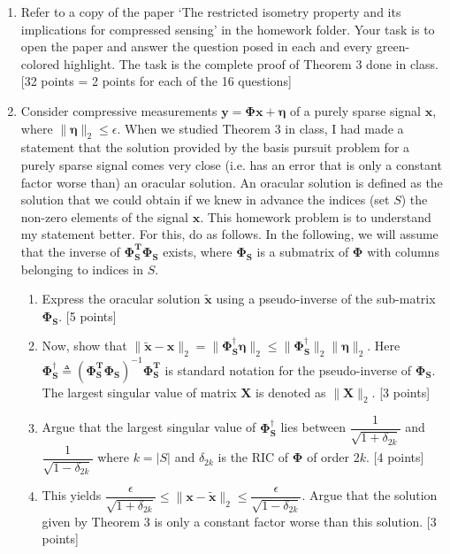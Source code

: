 \documentclass[11pt]{article}
\begin{document}
\begin{enumerate}
\item Refer to a copy of the paper `The restricted isometry property and its implications for compressed sensing' in the homework folder. Your task is to open the paper and answer the question posed in each and every green-colored highlight. The task is the complete proof of Theorem 3 done in class. \textsf{[32 points = 2 points for each of the 16 questions]}

\item Consider compressive measurements $\boldsymbol{y} = \boldsymbol{\Phi x} + \boldsymbol{\eta}$ of a purely sparse signal $\boldsymbol{x}$, where $\|\boldsymbol{\eta}\|_2 \leq \epsilon$. When we studied Theorem 3 in class, I had made a statement that the solution provided by the basis pursuit problem for a purely sparse signal comes very close (i.e. has an error that is only a constant factor worse than) an oracular solution. An oracular solution is defined as the solution that we could obtain if we knew in advance the indices (set $S$) the non-zero elements of the signal $\boldsymbol{x}$. This homework problem is to understand my statement better. For this, do as follows. In the following, we will assume that the inverse of $\boldsymbol{\Phi^T_S \Phi_S}$ exists, where $\boldsymbol{\Phi_S}$ is a submatrix of $\boldsymbol{\Phi}$ with columns belonging to indices in $S$.
\begin{enumerate}
\item Express the oracular solution $\boldsymbol{\tilde{x}}$ using a pseudo-inverse of the sub-matrix $\boldsymbol{\Phi_S}$. \textsf{[5 points]}
\item Now, show that $\|\boldsymbol{\tilde{x}}-\boldsymbol{x}\|_2 = \|\boldsymbol{\Phi^{\dagger}_S \eta}\|_2 \leq \|\boldsymbol{\Phi^{\dagger}_S}\|_2 \|\boldsymbol{\eta}\|_2$. 
Here $\boldsymbol{\Phi^{\dagger}_S} \triangleq (\boldsymbol{\Phi^T_S \Phi_S})^{-1} \boldsymbol{\Phi^T_S }$ is standard notation for the pseudo-inverse of $\boldsymbol{\Phi_S}$. The largest singular value of matrix $\boldsymbol{X}$ is denoted as $\|\boldsymbol{X}\|_2$.  \textsf{[3 points]}
\item Argue that the largest singular value of $\boldsymbol{\Phi^{\dagger}_S}$ lies between $\dfrac{1}{\sqrt{1+ \delta_{2k}}}$ and $\dfrac{1}{\sqrt{1- \delta_{2k}}}$ where $k = |S|$ and $\delta_{2k}$ is the RIC of $\boldsymbol{\Phi}$ of order $2k$.  \textsf{[4 points]}
\item This yields $\dfrac{\epsilon}{\sqrt{1+\delta_{2k}}} \leq \|\boldsymbol{x}-\boldsymbol{\tilde{x}}\|_2 \leq \dfrac{\epsilon}{\sqrt{1-\delta_{2k}}}$. Argue that the solution given by Theorem 3 is only a constant factor worse than this solution.  \textsf{[3 points]}
\end{enumerate}


\end{enumerate}
\end{document}
